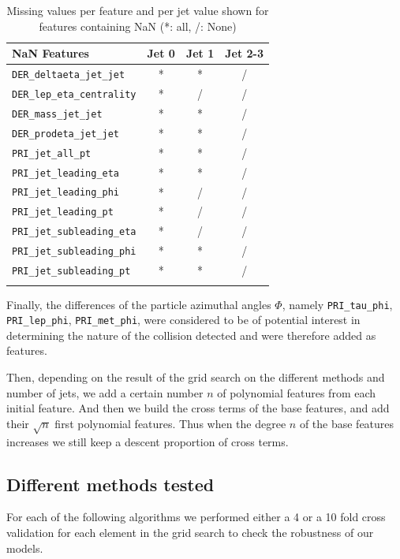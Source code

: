 \documentclass[10pt,conference,compsocconf]{IEEEtran}
\begin{document}
\begin{table}[h!]
\centering
\caption{Missing values per feature and per jet value shown for features containing NaN (*: all, /: None)}
\footnotesize
\hspace{-0.2cm}
\begin{tabular}{ l| ccc } 
 \hline
   NaN Features & Jet 0 & Jet 1 & Jet 2-3 \\
 \hline
   \verb+DER_deltaeta_jet_jet+  & * & * & /  \\
   \verb+DER_lep_eta_centrality+  & * & / & / \\
   \verb+DER_mass_jet_jet+  & * & * & / \\
   \verb+DER_prodeta_jet_jet+  & * & * & /  \\ 
   \verb+PRI_jet_all_pt+  & * & * & /  \\
   \verb+PRI_jet_leading_eta+  & * & * & / \\
   \verb+PRI_jet_leading_phi+  & * & / & /   \\
   \verb+PRI_jet_leading_pt+  & * & / & / \\
   \verb+PRI_jet_subleading_eta+  & * & / & / \\
   \verb+PRI_jet_subleading_phi+  & * & * & /  \\
   \verb+PRI_jet_subleading_pt+  & * & * & /  \\
  \hline
\label{tab_feats}
\end{tabular}
\end{table}

Finally, the differences of the particle azimuthal angles $\Phi$, namely \verb+PRI_tau_phi+, \verb+PRI_lep_phi+, \verb+PRI_met_phi+, were considered to be of potential interest in determining the nature of the collision detected and were therefore added as features.

Then, depending on the result of the grid search on the different methods and number of jets, we add a certain number $n$ of polynomial features from each initial feature. And then we build the cross terms of the base features, and add their $\sqrt{n}$ first polynomial features. Thus when the degree $n$ of the base features increases we still keep a descent proportion of cross terms.

\subsection{Different methods tested}

For each of the following algorithms we performed either a 4 or a 10 fold cross validation for each element in the grid search to check the robustness of our models.
\end{document}
